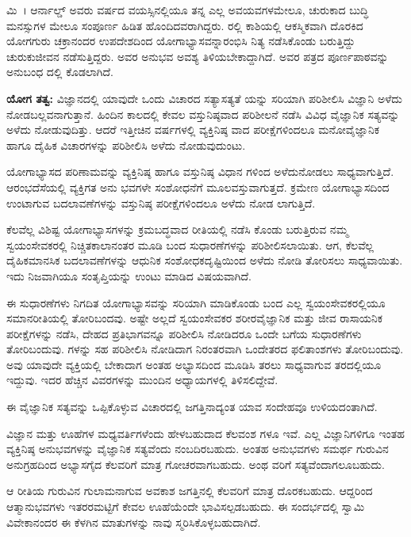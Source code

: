 ಮಿ~। ಆರ್ನಾಲ್ಡ್ ಅವರು  ವರ್ಷದ ವಯಸ್ಸಿನಲ್ಲಿಯೂ ತನ್ನ ಎಲ್ಲ ಅವಯವಗಳಮೇಲೂ, ಚುರುಕಾದ ಬುದ್ಧಿ ಮನಸ್ಸುಗಳ ಮೇಲೂ ಸಂಪೂರ್ಣ ಹಿಡಿತ ಹೊಂದಿದವರಾಗಿದ್ದರು.  ರಲ್ಲಿ ಕಾಶಿಯಲ್ಲಿ ಆಕಸ್ಮಿಕವಾಗಿ ದೊರಕಿದ ಯೋಗಗುರು ಚಕ್ರಾನಂದರ ಉಪದೇಶದಿಂದ ಯೋಗಾಭ್ಯಾಸವನ್ನಾರಂಭಿಸಿ ನಿತ್ಯ ನಡೆಸಿಕೊಂಡು ಬರುತ್ತಿದ್ದು ಚುರುಕುಜೀವನ ನಡೆಸುತ್ತಿದ್ದರು. ಅವರ ಅನುಭವ ಅವಶ್ಯ ತಿಳಿಯಬೇಕಾದ್ದಾಗಿದೆ. ಅವರ ಪತ್ರದ ಪೂರ್ಣಪಾಠವನ್ನು ಅನುಬಂಧ  ದಲ್ಲಿ ಕೊಡಲಾಗಿದೆ.

\textbf{ಯೋಗ ತತ್ವ:} ವಿಜ್ಞಾನದಲ್ಲಿ ಯಾವುದೇ ಒಂದು ವಿಚಾರದ ಸತ್ಯಾಸತ್ಯತೆ ಯನ್ನು ಸರಿಯಾಗಿ ಪರಿಶೀಲಿಸಿ ವಿಜ್ಞಾನಿ ಅಳೆದು ನೋಡಬಲ್ಲವನಾಗುತ್ತಾನೆ. ಹಿಂದಿನ ಕಾಲದಲ್ಲಿ ಕೇವಲ ವಸ್ತುನಿಷ್ಠವಾದ ಪರಿಶೀಲನೆ ನಡೆಸಿ ವಿವಿಧ ವೈಜ್ಞಾನಿಕ ಸತ್ಯವನ್ನು ಅಳೆದು ನೋಡುವುದಿತ್ತು. ಆದರೆ ಇತ್ತೀಚಿನ ವರ್ಷಗಳಲ್ಲಿ ವ್ಯಕ್ತಿನಿಷ್ಠ ವಾದ ಪರೀಕ್ಷೆಗಳಿಂದಲೂ ಮನೋವೈಜ್ಞಾನಿಕ ಹಾಗೂ ದೈಹಿಕ ವಿಚಾರಗಳನ್ನು ಪರಿಶೀಲಿಸಿ ಅಳೆದು ನೋಡುವುದುಂಟು.

ಯೋಗಾಭ್ಯಾಸದ ಪರಿಣಾಮವನ್ನು ವ್ಯಕ್ತಿನಿಷ್ಠ ಹಾಗೂ ವಸ್ತುನಿಷ್ಠ ವಿಧಾನ ಗಳಿಂದ ಅಳೆದುನೋಡಲು ಸಾಧ್ಯವಾಗುತ್ತಿದೆ. ಆರಂಭದೆಸೆಯಲ್ಲಿ ವ್ಯಕ್ತಿಗತ ಅನು ಭವಗಳೇ ಸಂಶೋಧನೆಗೆ ಮೂಲವಸ್ತುವಾಗುತ್ತದೆ. ಕ್ರಮೇಣ ಯೋಗಾಭ್ಯಾಸದಿಂದ ಉಂಟಾಗುವ ಬದಲಾವಣೆಗಳನ್ನು ವಸ್ತುನಿಷ್ಠ ಪರೀಕ್ಷೆಗಳಿಂದಲೂ ಅಳೆದು ನೋಡ ಲಾಗುತ್ತಿದೆ.

ಕೆಲವೆಲ್ಲ ವಿಶಿಷ್ಟ ಯೋಗಾಭ್ಯಾಸಗಳನ್ನು ಕ್ರಮಬದ್ಧವಾದ ರೀತಿಯಲ್ಲಿ ನಡೆಸಿ ಕೊಂಡು ಬರುತ್ತಿರುವ ನಮ್ಮ ಸ್ವಯಂಸೇವಕರಲ್ಲಿ ನಿಚ್ಚಿತಕಾಲಾನಂತರ ಮೂಡಿ ಬಂದ ಸುಧಾರಣೆಗಳನ್ನು ಪರಿಶೀಲಿಸಲಾಯಿತು. ಆಗ, ಕೆಲವೆಲ್ಲ ದೈಹಿಕಮಾನಸಿಕ ಬದಲಾವಣೆಗಳನ್ನು ಆಧುನಿಕ ಸಂಶೋಧಕದೃಷ್ಟಿಯಿಂದ ಅಳೆದು ನೋಡಿ ತೋರಿಸಲು ಸಾಧ್ಯವಾಯಿತು. ಇದು ನಿಜವಾಗಿಯೂ ಸಂತೃಪ್ತಿಯನ್ನು ಉಂಟು ಮಾಡಿದ ವಿಷಯವಾಗಿದೆ.

ಈ ಸುಧಾರಣೆಗಳು ನಿಗದಿತ ಯೋಗಾಭ್ಯಾಸವನ್ನು ಸರಿಯಾಗಿ ಮಾಡಿಕೊಂಡು ಬಂದ ಎಲ್ಲ ಸ್ವಯಂಸೇವಕರಲ್ಲಿಯೂ ಸಮಾನರೀತಿಯಲ್ಲಿ ತೋರಿಬಂದವು. ಅಷ್ಟೇ ಅಲ್ಲದೆ ಸ್ವಯಂಸೇವಕರ ಶರೀರವೈಜ್ಞಾನಿಕ  ಮತ್ತು ಜೀವ ರಾಸಾಯನಿಕ ಪರೀಕ್ಷೆಗಳನ್ನು ನಡೆಸಿ, ದೇಹದ ಪ್ರತಿಭಾಗವನ್ನೂ ಪರಿಶೀಲಿಸಿ ನೋಡಿದರೂ ಒಂದೇ ಬಗೆಯ ಸುಧಾರಣೆಗಳು ತೋರಿಬಂದುವು.  \enginline{} ಗಳನ್ನು ಸಹ ಪರಿಶೀಲಿಸಿ ನೋಡಿದಾಗ ನಿರಂತರವಾಗಿ ಒಂದೇತರದ ಫಲಿತಾಂಶಗಳು ತೋರಿಬಂದುವು. ಅವು ಯಾವುದೇ ವ್ಯಕ್ತಿಯಲ್ಲಿ ಬೇಕಾದಾಗ ಅಂತಹ ಅಭ್ಯಾಸದಿಂದ ಮೂಡಿಸಿ ತರಲು ಸಾಧ್ಯವಾಗುವ ತರದಲ್ಲಿಯೂ ಇದ್ದುವು. ಇದರ ಹೆಚ್ಚಿನ ವಿವರಗಳನ್ನು ಮುಂದಿನ ಅಧ್ಯಾಯಗಳಲ್ಲಿ ತಿಳಿಸಲಿದ್ದೇವೆ.

ಈ ವೈಜ್ಞಾನಿಕ ಸತ್ಯವನ್ನು ಒಪ್ಪಿಕೊಳ್ಳುವ ವಿಚಾರದಲ್ಲಿ ಜಗತ್ತಿನಾದ್ಯಂತ ಯಾವ ಸಂದೇಹವೂ ಉಳಿಯದಂತಾಗಿದೆ.

ವಿಜ್ಞಾನ ಮತ್ತು ಊಹೆಗಳ ಮಧ್ಯವರ್ತಿಗಳೆಂದು ಹೇಳಬಹುದಾದ ಕೆಲವಂಶ ಗಳೂ ಇವೆ. ಎಲ್ಲ ವಿಜ್ಞಾನಿಗಳಿಗೂ ಇಂತಹ ವ್ಯಕ್ತಿನಿಷ್ಠ ಅನುಭವಗಳನ್ನು ವೈಜ್ಞಾನಿಕ ಸತ್ಯವೆಂದು ನಂಬದಿರಬಹುದು. ಅಂತಹ ಅನುಭವಗಳು ಸಮರ್ಥ ಗುರುವಿನ ಅನುಗ್ರಹದಿಂದ ಅಭ್ಯಾಸಗೈದ ಕೆಲವರಿಗೆ ಮಾತ್ರ ಗೋಚರವಾಗಬಹುದು. ಅಂಥ ವರಿಗೆ ಸತ್ಯವೆಂದಾಗಲೂಬಹುದು.

ಆ ರೀತಿಯ ಗುರುವಿನ ಗುಲಾಮನಾಗುವ ಅವಕಾಶ ಜಗತ್ತಿನಲ್ಲಿ ಕೆಲವರಿಗೆ ಮಾತ್ರ ದೊರಕಬಹುದು. ಆದ್ದರಿಂದ ಆತ್ಮಾನುಭವಗಳು ಇತರರಮಟ್ಟಿಗೆ ಕೇವಲ ಊಹೆಯೆಂದೇ ಭಾವಿಸಲ್ಪಡಬಹುದು. ಈ ಸಂದರ್ಭದಲ್ಲಿ ಸ್ವಾಮಿ ವಿವೇಕಾನಂದರ ಈ ಕೆಳಗಿನ ಮಾತುಗಳನ್ನು ನಾವು ಸ್ಮರಿಸಿಕೊಳ್ಳಬಹುದಾಗಿದೆ.

